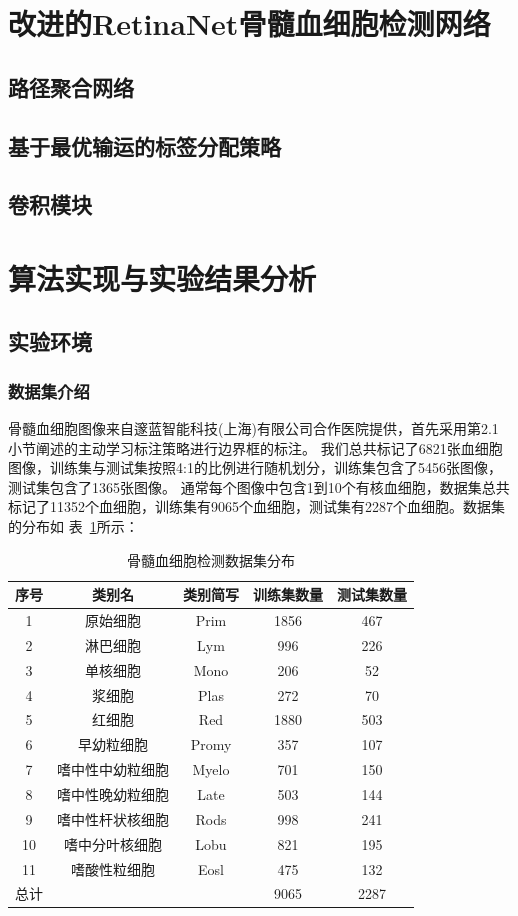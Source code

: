 \section{改进的RetinaNet骨髓血细胞检测网络}
\subsection{路径聚合网络}
\subsection{基于最优输运的标签分配策略}
\subsection{卷积模块}
\section{算法实现与实验结果分析}
\subsection{实验环境}

\subsubsection{数据集介绍}

骨髓血细胞图像来自邃蓝智能科技(上海)有限公司合作医院提供，首先采用第2.1小节阐述的主动学习标注策略进行边界框的标注。
我们总共标记了6821张血细胞图像，训练集与测试集按照4:1的比例进行随机划分，训练集包含了5456张图像，测试集包含了1365张图像。
通常每个图像中包含1到10个有核血细胞，数据集总共标记了11352个血细胞，训练集有9065个血细胞，测试集有2287个血细胞。数据集的分布如
表~\ref{table:cell_detect}所示：

\begin{table}
  \caption{骨髓血细胞检测数据集分布}   
  \centering 
  \label{table:cell_detect}
  \begin{tabular}{ccccc}
    \toprule[2pt]
    序号 & 类别名  &  类别简写 & 训练集数量 & 测试集数量 \\
    \midrule[1.5pt] 
    1 & 原始细胞 & Prim & 1856 & 467 \\ 
    2 & 淋巴细胞 & Lym & 996 & 226   \\ 
    3 & 单核细胞 & Mono & 206 & 52   \\ 
    4 & 浆细胞 & Plas & 272 & 70   \\ 
    5 & 红细胞 & Red & 1880 & 503   \\ 
    6 & 早幼粒细胞 & Promy & 357 & 107   \\ 
    7 & 嗜中性中幼粒细胞 & Myelo & 701 & 150   \\ 
    8 & 嗜中性晚幼粒细胞 & Late & 503 & 144   \\ 
    9 & 嗜中性杆状核细胞 & Rods & 998 & 241   \\  
    10 & 嗜中分叶核细胞 & Lobu & 821 & 195   \\  
    11 & 嗜酸性粒细胞 & Eosl & 475 & 132   \\  
    \hline
    总计 &   &   & 9065 & 2287 \\
    \bottomrule[2pt]      
  \end{tabular} 
\end{table}

